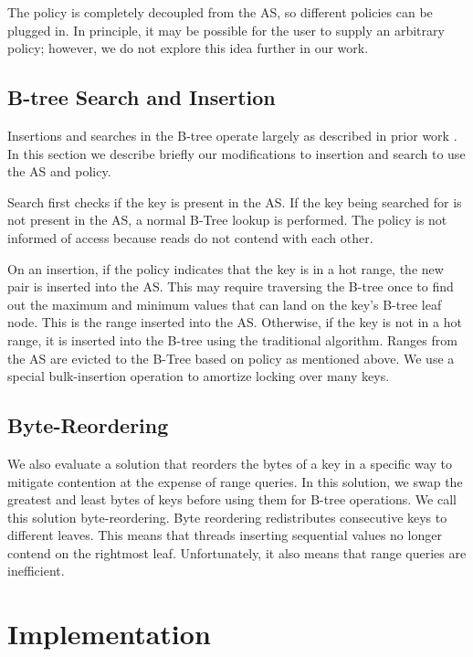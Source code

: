 \documentclass[twocolumn]{article}
\begin{document}
The policy is completely decoupled from the AS, so different policies can be
plugged in. In principle, it may be possible for the user to supply an
arbitrary policy; however, we do not explore this idea further in our work.

\subsection{B-tree Search and Insertion}

Insertions and searches in the B-tree operate largely as described in prior
work \cite{art, critique}. In this section we describe briefly our
modifications to insertion and search to use the AS and policy.

Search first checks if the key is present in the AS. If the key being searched
for is not present in the AS, a normal B-Tree lookup is performed. The policy
is not informed of access because reads do not contend with each other.

On an insertion, if the policy indicates that the key is in a hot range, the
new pair is inserted into the AS. This may require traversing the B-tree once
to find out the maximum and minimum values that can land on the key’s B-tree
leaf node. This is the range inserted into the AS. Otherwise, if the key is not
in a hot range, it is inserted into the B-tree using the traditional algorithm.
Ranges from the AS are evicted to the B-Tree based on policy as mentioned
above. We use a special bulk-insertion operation to amortize locking over many
keys.

\subsection{Byte-Reordering}

We also evaluate a solution that reorders the bytes of a key in a specific way
to mitigate contention at the expense of range queries. In this solution, we
swap the greatest and least bytes of keys before using them for B-tree
operations. We call this solution byte-reordering. Byte reordering
redistributes consecutive keys to different leaves. This means that threads
inserting sequential values no longer contend on the rightmost leaf.
Unfortunately, it also means that range queries are inefficient.

\section{Implementation}
\end{document}
